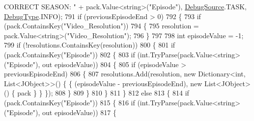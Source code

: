 \begin{DoxyCode}
{       CORRECT SEASON: "} + pack.Value<\textcolor{keywordtype}{string}>(\textcolor{stringliteral}{"Episode"}), \mbox{\hyperlink{namespace_little_weeb_library_1_1_handlers_a2a6ca0775121c9c503d58aa254d292be}{DebugSource}}.TASK, 
      \mbox{\hyperlink{namespace_little_weeb_library_1_1_handlers_ab66019ed40462876ec4e61bb3ccb0a62}{DebugType}}.INFO);
791                             \textcolor{keywordflow}{if} (previousEpisodeEnd > 0)
792                             \{
793                                 \textcolor{keywordflow}{if} (pack.ContainsKey(\textcolor{stringliteral}{"Video\_Resolution"}))
794                                 \{
795                                     resolution = pack.Value<\textcolor{keywordtype}{string}>(\textcolor{stringliteral}{"Video\_Resolution"});
796                                 \}
797 
798                                 \textcolor{keywordtype}{int} episodeValue = -1;
799                                 \textcolor{keywordflow}{if} (!resolutions.ContainsKey(resolution))
800                                 \{
801                                     \textcolor{keywordflow}{if} (pack.ContainsKey(\textcolor{stringliteral}{"Episode"}))
802                                     \{
803                                         \textcolor{keywordflow}{if} (\textcolor{keywordtype}{int}.TryParse(pack.Value<\textcolor{keywordtype}{string}>(\textcolor{stringliteral}{"Episode"}), out episodeValue))
804                                         \{
805                                             \textcolor{keywordflow}{if} (episodeValue > previousEpisodeEnd)
806                                             \{
807                                                 resolutions.Add(resolution, \textcolor{keyword}{new} Dictionary<\textcolor{keywordtype}{int}, 
      List<JObject>>() \{ \{ (episodeValue - previousEpisodeEnd), \textcolor{keyword}{new} List<JObject>() \{ pack \} \} \});
808                                             \}
809                                         \}
810                                     \}
811                                 \}
812                                 \textcolor{keywordflow}{else}
813                                 \{
814                                     \textcolor{keywordflow}{if} (pack.ContainsKey(\textcolor{stringliteral}{"Episode"}))
815                                     \{
816                                         \textcolor{keywordflow}{if} (\textcolor{keywordtype}{int}.TryParse(pack.Value<\textcolor{keywordtype}{string}>(\textcolor{stringliteral}{"Episode"}), out episodeValue))
817                                         \{

\end{DoxyCode}
